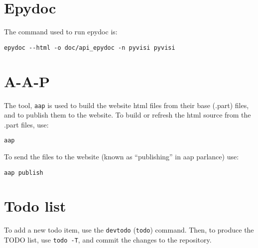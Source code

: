 \documentclass[12pt,a4paper]{article}
\begin{document}
\section{Epydoc}

The command used to run epydoc is:
\begin{verbatim}
epydoc --html -o doc/api_epydoc -n pyvisi pyvisi
\end{verbatim}

\section{A-A-P}

The tool, \texttt{aap} is used to build the website html files from their base
(.part) files, and to publish them to the website.  To build or refresh the
html source from the .part files, use:
\begin{verbatim}
aap
\end{verbatim}
To send the files to the website (known as ``publishing'' in aap parlance)
use:
\begin{verbatim}
aap publish
\end{verbatim}

\section{Todo list}

To add a new todo item, use the \texttt{devtodo} (\texttt{todo}) command.
Then, to produce the TODO list, use \texttt{todo -T}, and commit the changes
to the repository.
\end{document}
